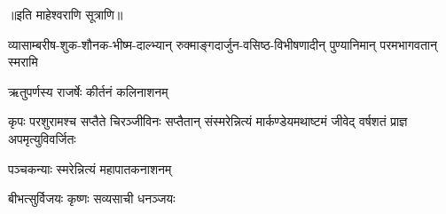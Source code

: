 \begin{center}
॥इति माहेश्वराणि सूत्राणि॥


{व्यासाम्बरीष-शुक-शौनक-भीष्म-दाल्भ्यान्}
{रुक्माङ्गदार्जुन-वसिष्ठ-विभीषणादीन्}
{पुण्यानिमान् परमभागवतान् स्मरामि}


{ऋतुपर्णस्य राजर्षेः कीर्तनं कलिनाशनम्}

{कृपः परशुरामश्च सप्तैते चिरञ्जीविनः}
{सप्तैतान् संस्मरेन्नित्यं मार्कण्डेयमथाष्टमं}
{जीवेद् वर्षशतं प्राज्ञ अपमृत्युविवर्जितः}

{पञ्चकन्याः स्मरेन्नित्यं महापातकनाशनम्}


{बीभत्सुर्विजयः कृष्णः सव्यसाची धनञ्जयः}





\closesection
\clearpage

\closesection
\clearpage


\closesection
\clearpage



\closesection
\clearpage




\closesection
\clearpage




\closesection
\clearpage


\end{center}
